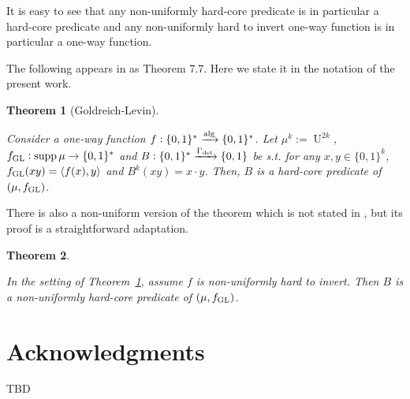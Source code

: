\documentclass{article}
\numberwithin{equation}{section}
\theoremstyle{definition}
\theoremstyle{plain}
\newtheorem{theorem}{Theorem}[section]
\newcommand{\Bool}{\{0,1\}}
\newcommand{\Words}{{\Bool^*}}
\newcommand{\WordsLen}[1]{{\Bool^{#1}}}
\DeclareMathOperator{\Supp}{supp}
\DeclareMathOperator{\Un}{U}
\newcommand{\Chev}[1]{\langle #1 \rangle}
\newcommand{\Alg}{\xrightarrow{\textnormal{alg}}}
\begin{document}
It is easy to see that any non-uniformly hard-core predicate is in particular a hard-core predicate and any non-uniformly hard to invert one-way function is in particular a one-way function.

The following appears in \cite{Goldreich_2008} as Theorem 7.7. Here we state it in the notation of the present work.

\begin{theorem}[Goldreich-Levin]
\label{thm:goldreich_levin}

Consider a one-way function ${f: \Words \Alg \Words}$. Let $\mu^k:=\Un^{2k}$, $f_{\textnormal{GL}}: \Supp \mu \rightarrow \Words$ and ${B: \Words \xrightarrow{\Gamma_{\textnormal{det}}} \Bool}$ be s.t. for any $x,y \in \WordsLen{k}$, $f_{\textnormal{GL}}(xy)=\Chev{f(x),y}$ and ${B^k(xy)=x \cdot y}$. Then, $B$ is a hard-core predicate of $(\mu, f_{\textnormal{GL}})$.

\end{theorem}

There is also a non-uniform version of the theorem which is not stated in \cite{Goldreich_2008}, but its proof is a straightforward adaptation.

\begin{theorem}
\label{thm:goldreich_levin_circ}

In the setting of Theorem~\ref{thm:goldreich_levin}, assume $f$ is non-uniformly hard to invert. Then $B$ is a non-uniformly hard-core predicate of $(\mu, f_{\textnormal{GL}})$.
\end{theorem}

\section*{Acknowledgments}

TBD



\end{document}
